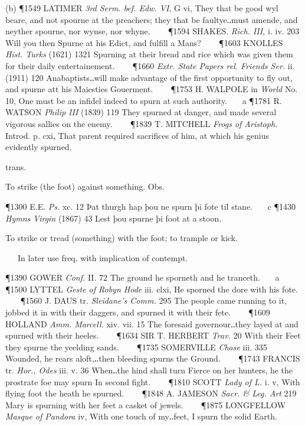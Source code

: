 \begin{description}[wide, labelwidth=!, labelindent=0pt]
\begin{myenumerate}
(b) \P 1549 LATIMER  \textit{3rd Serm. bef. Edw. VI}, G vi, They that be good wyl beare, and not spourne at the preachers; they that be faultye‥must amende, and neyther spourne, nor wynse, nor whyne.    
\P 1594 SHAKES.  \textit{Rich. III,} i. iv. 203 Will you then Spurne at his Edict, and fulfill a Mans?    
\P 1603 KNOLLES  \textit{Hist. Turks} (1621) 1321 Spurning  at their bread and rice which was given them for their daily entertainement.    
\P 1660 \textit{Extr.  State Papers rel. Friends Ser.} ii. (1911) 120 Anabaptists‥will make advantage of the first opportunity to fly out, and spurne att his Maiesties Gouerment.    
\P 1753 H. WALPOLE in  \textit{World} No. 10, One must be an infidel indeed to spurn at such authority.    a 
\P 1781 R. WATSON  \textit{Philip III} (1839) 119 They spurned at danger, and made several vigorous sallies on the enemy.    
\P 1839 T. MITCHELL  \textit{Frogs of Aristoph.} Introd. p. cxi, That parent required sacrifices of him, at which his genius evidently spurned.

 trans.

 To strike (the foot) against something. Obs.

\P 1300 E.E.  \textit{Ps.} xc. 12 Þat thurgh hap þou ne spurn þi fote til stane.    c 
\P 1430 \textit{Hymns  Virgin} (1867) 43 Lest þou spurne þi foot at a stoon.

 To strike or tread (something) with the foot; to trample or kick.

   In later use freq. with implication of contempt.

\P 1390 GOWER  \textit{Conf.} II. 72 The ground he sporneth and he tranceth.    a 
\P 1500 LYTTEL  \textit{Geste of Robyn Hode} iii. clxi, He sporned the dore with his fote.    
\P 1560 J. DAUS tr. \textit{Sleidane's Comm.} 295 The people came running to it, jobbed it in with their daggers, and spurned it with their fete.    
\P 1609 HOLLAND  \textit{Amm. Marcell.} xiv. vii. 15 The foresaid governour‥they layed at and spurned with their heeles.    
\P 1634 SIR T. HERBERT  \textit{Trav.} 20 With their Feet they spurne the yeelding sands.    
\P 1735 SOMERVILLE  \textit{Chase} iii. 335 Wounded, he rears aloft,‥then bleeding spurns the Ground.    
\P 1743 FRANCIS tr.  \textit{Hor., Odes} iii. v. 36 When‥the hind shall turn Fierce on her hunters, he the prostrate foe may spurn In second fight.    
\P 1810 SCOTT  \textit{Lady of L.} i. v, With flying foot the heath he spurned.    
\P 1848 A. JAMESON  \textit{Sacr. \& Leg. Art} 219 Mary is spurning with her feet a casket of jewels.    
\P 1875 LONGFELLOW  \textit{Masque of Pandora} iv, With one touch of my‥feet, I spurn the solid Earth.


\end{myenumerate}
\end{description}
